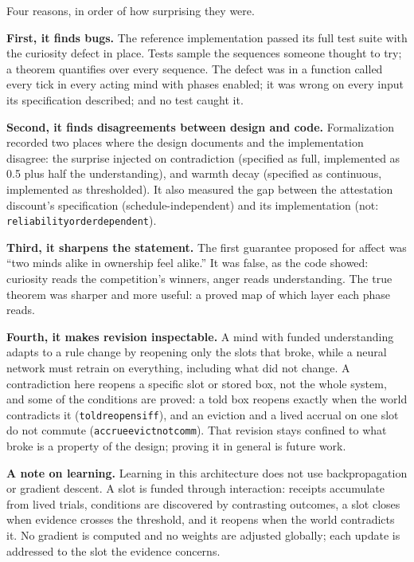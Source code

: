 \documentclass[11pt]{article}
\newcommand{\leanus}{\textunderscore\allowbreak}
\newcommand{\lean}[1]{{\let\_\leanus\texttt{#1}}}
\theoremstyle{remark}
\begin{document}
Four reasons, in order of how surprising they were.

\textbf{First, it finds bugs.} The reference implementation passed its full test suite with
the curiosity defect in place. Tests sample the sequences someone thought to try; a theorem
quantifies over every sequence. The defect was in a function called every tick in every acting mind with phases enabled;
it was wrong on every input its specification described; and no test caught it.

\textbf{Second, it finds disagreements between design and code.} Formalization recorded two
places where the design documents and the implementation disagree: the surprise injected on
contradiction (specified as full, implemented as 0.5 plus half the understanding), and warmth decay (specified
as continuous, implemented as thresholded). It also measured the gap between the
attestation discount's specification (schedule-independent) and its implementation (not:
\lean{reliability\_order\_dependent}).

\textbf{Third, it sharpens the statement.} The first guarantee proposed for affect was
``two minds alike in ownership feel alike.'' It was false, as the code showed: curiosity
reads the competition's winners, anger reads understanding. The true theorem was sharper
and more useful: a proved map of which layer each phase reads.

\textbf{Fourth, it makes revision inspectable.} A mind with funded understanding adapts to a
rule change by reopening only the slots that broke, while a neural network must retrain on
everything, including what did not change. A contradiction here reopens a specific slot or
stored box, not the whole system, and some of the conditions are proved: a told box reopens
exactly when the world contradicts it (\lean{told\_reopens\_iff}), and an eviction and a
lived accrual on one slot do not commute (\lean{accrue\_evict\_not\_comm}). That revision
stays confined to what broke is a property of the design; proving it in general is future
work.

\textbf{A note on learning.} Learning in this architecture does not use backpropagation or
gradient descent. A slot is funded through interaction: receipts accumulate from lived
trials, conditions are discovered by contrasting outcomes, a slot closes when evidence
crosses the threshold, and it reopens when the world contradicts it. No gradient is
computed and no weights are adjusted globally; each update is addressed to the slot the
evidence concerns.
\end{document}
